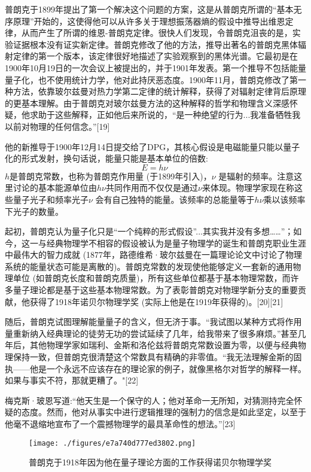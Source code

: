 普朗克于1899年提出了第一个解决这个问题的方案，这是从普朗克所谓的“基本无序原理”开始的，这使得他可以从许多关于理想振荡器熵的假设中推导出维恩定律，从而产生了所谓的维恩-普朗克定律。很快人们发现，令普朗克沮丧的是，实验证据根本没有证实新定律。普朗克修改了他的方法，推导出著名的普朗克黑体辐射定律的第一个版本，该定律很好地描述了实验观察到的黑体光谱。它最初是在1900年10月19日的一次会议上被提出的，并于1901年发表。第一个推导不包括能量量子化，也不使用统计力学，他对此持厌恶态度。1900年11月，普朗克修改了第一种方法，依靠玻尔兹曼对热力学第二定律的统计解释，获得了对辐射定律背后原理的更基本理解。由于普朗克对玻尔兹曼方法的这种解释的哲学和物理含义深感怀疑，他求助于这些解释，正如他后来所说的，“是一种绝望的行为...我准备牺牲我以前对物理的任何信念。”[19]

他的新推导于1900年12月14日提交给了DPG，其核心假设是电磁能量只能以量子化的形式发射，换句话说，能量只能是基本单位的倍数:
$$E=h\nu ~$$
$h$是普朗克常数，也称为普朗克作用量 (于1899年引入)，$\nu $ 是辐射的频率。注意这里讨论的基本能源单位由$h\nu$共同作用而不仅仅是通过$\nu$来体现。物理学家现在称这些量子光子和频率光子$\nu$  会有自己独特的能量。该频率的总能量等于$h\nu$乘以该频率下光子的数量。

起初，普朗克认为量子化只是“一个纯粹的形式假设”...其实我并没有多想……”；如今，这一与经典物理学不相容的假设被认为是量子物理学的诞生和普朗克职业生涯中最伟大的智力成就 (1877年，路德维希·玻尔兹曼在一篇理论论文中讨论了物理系统的能量状态可能是离散的)。普朗克常数的发现使他能够定义一套新的通用物理单位 (如普朗克长度和普朗克质量)，所有这些单位都基于基本物理常数，而许多量子理论都是基于这些基本物理常数。为了表彰普朗克对物理学新分支的重要贡献，他获得了1918年诺贝尔物理学奖 (实际上他是在1919年获得的)。[20][21]

随后，普朗克试图理解能量量子的含义，但无济于事。“我试图以某种方式将作用量重新纳入经典理论的徒劳无功的尝试延续了几年，给我带来了很多麻烦。”甚至几年后，其他物理学家如瑞利、金斯和洛伦兹将普朗克常数设置为零，以便与经典物理保持一致，但普朗克很清楚这个常数具有精确的非零值。“我无法理解金斯的固执——他是一个永远不应该存在的理论家的例子，就像黑格尔对哲学的解释一样。如果与事实不符，那就更糟了。"[22]

梅克斯·玻恩写道:“他天生是一个保守的人；他对革命一无所知，对猜测持完全怀疑的态度。然而，他对从事实中进行逻辑推理的强制力的信念是如此坚定，以至于他毫不退缩地宣布了一个震撼物理学的最具革命性的想法。”[23]
\begin{figure}[ht]
\centering
\texttt{[image: ./figures/e7a740d777ed3802.png]}
\caption{普朗克于1918年因为他在量子理论方面的工作获得诺贝尔物理学奖} \label{fig_Max_4}
\end{figure}

